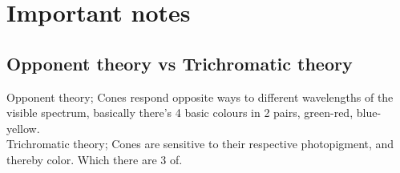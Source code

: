 \documentclass{article}
\begin{document}
\section{Important notes}
\subsection{Opponent theory vs Trichromatic theory}
Opponent theory; Cones respond opposite ways to different wavelengths of the visible spectrum, basically there's 4 basic colours in 2 pairs, green-red, blue-yellow.\\
Trichromatic theory; Cones are sensitive to their respective photopigment, and thereby color. Which there are 3 of.\\
\end{document}
